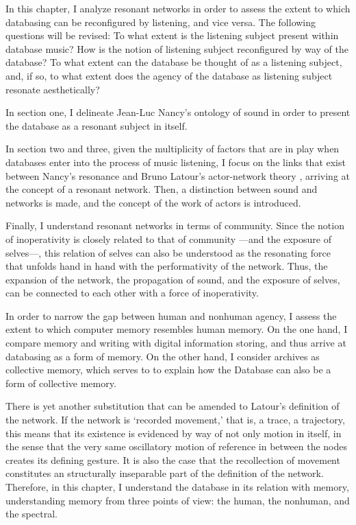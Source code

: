 


In this chapter, I analyze resonant networks in order to assess the extent to which databasing can be reconfigured by listening, and vice versa. The following questions will be revised: To what extent is the listening subject present within database music? How is the notion of listening subject reconfigured by way of the database? To what extent can the database be thought of as a listening subject, and, if so, to what extent does the agency of the database as listening subject resonate aesthetically?

In section one, I delineate Jean-Luc Nancy's ontology of sound in order to present the database as a resonant subject in itself. 

In section two and three, given the multiplicity of factors that are in play when databases enter into the process of music listening, I focus on the links that exist between Nancy's resonance and Bruno Latour's actor-network theory \parencite{Lat90:On, Lat93:We}, arriving at the concept of a resonant network. Then, a distinction between sound and networks is made, and the concept of the work of actors is introduced.

Finally, I understand resonant networks in terms of community. Since the notion of inoperativity is closely related to that of community ---and the exposure of selves---, this relation of selves can also be understood as the resonating force that unfolds hand in hand with the performativity of the network. Thus, the expansion of the network, the propagation of sound, and the exposure of selves, can be connected to each other with a force of inoperativity.






In order to narrow the gap between human and nonhuman agency, I assess the extent to which computer memory resembles human memory. On the one hand, I compare memory and writing with digital information storing, and thus arrive at databasing as a form of memory. On the other hand, I consider archives as collective memory, which serves to to explain how the Database can also be a form of collective memory. 

There is yet another substitution that can be amended to Latour's definition of the network. If the network is `recorded movement,' that is, a trace, a trajectory, this means that its existence is evidenced by way of not only motion in itself, in the sense that the very same oscillatory motion of reference in between the nodes creates its defining gesture. It is also the case that the recollection of movement constitutes an structurally inseparable part of the definition of the network. Therefore, in this chapter, I understand the database in its relation with memory, understanding memory from three points of view: the human, the nonhuman, and the spectral.

